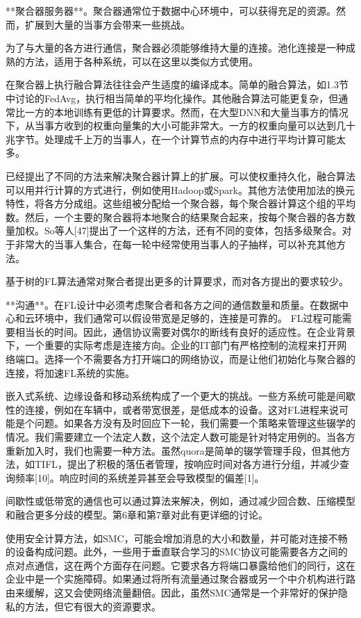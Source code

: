 **聚合器服务器**。聚合器通常位于数据中心环境中，可以获得充足的资源。然而，扩展到大量的当事方会带来一些挑战。

为了与大量的各方进行通信，聚合器必须能够维持大量的连接。池化连接是一种成熟的方法，适用于各种系统，可以在这里以类似方式使用。

在聚合器上执行融合算法往往会产生适度的编译成本。简单的融合算法，如1.3节中讨论的FedAvg，执行相当简单的平均化操作。其他融合算法可能更复杂，但通常比一方的本地训练有更低的计算要求。然而，在大型DNN和大量当事方的情况下，从当事方收到的权重向量集的大小可能非常大。一方的权重向量可以达到几十兆字节。处理成千上万的当事人，在一个计算节点的内存中进行平均计算可能太多。

已经提出了不同的方法来解决聚合器计算上的扩展。可以使权重持久化，融合算法可以用并行计算的方式进行，例如使用Hadoop或Spark。其他方法使用加法的换元特性，将各方分成组。这些组被分配给一个聚合器，每个聚合器计算这个组的平均数。然后，一个主要的聚合器将本地聚合的结果聚合起来，按每个聚合器的各方数量加权。So等人[47]提出了一个这样的方法，还有不同的变体，包括多级聚合。对于非常大的当事人集合，在每一轮中经常使用当事人的子抽样，可以补充其他方法。

基于树的FL算法通常对聚合者提出更多的计算要求，而对各方提出的要求较少。

**沟通**。在FL设计中必须考虑聚合者和各方之间的通信数量和质量。在数据中心和云环境中，我们通常可以假设带宽是足够的，连接是可靠的。
FL过程可能需要相当长的时间。因此，通信协议需要对偶尔的断线有良好的适应性。在企业背景下，一个重要的实际考虑是连接方向。企业的IT部门有严格控制的流程来打开网络端口。选择一个不需要各方打开端口的网络协议，而是让他们初始化与聚合器的连接，将加速FL系统的实施。

嵌入式系统、边缘设备和移动系统构成了一个更大的挑战。一些方系统可能是间歇性的连接，例如在车辆中，或者带宽很差，是低成本的设备。这对FL进程来说可能是个问题。如果各方没有及时回应下一轮，我们需要一个策略来管理这些辍学的情况。我们需要建立一个法定人数，这个法定人数可能是针对特定用例的。当各方重新加入时，我们也需要一种方法。虽然quora是简单的辍学管理手段，但其他方法，如TIFL，提出了积极的落伍者管理，按响应时间对各方进行分组，并减少查询频率[10]。响应时间的系统差异甚至会导致模型的偏差[1]。

间歇性或低带宽的通信也可以通过算法来解决，例如，通过减少回合数、压缩模型和融合更多分歧的模型。第6章和第7章对此有更详细的讨论。

使用安全计算方法，如SMC，可能会增加消息的大小和数量，并可能对连接不畅的设备构成问题。此外，一些用于垂直联合学习的SMC协议可能需要各方之间的点对点通信，这在两个方面存在问题。它要求各方将端口暴露给他们的同行，这在企业中是一个实施障碍。如果通过将所有流量通过聚合器或另一个中介机构进行路由来缓解，这又会使网络流量翻倍。因此，虽然SMC通常是一个非常好的保护隐私的方法，但它有很大的资源要求。

